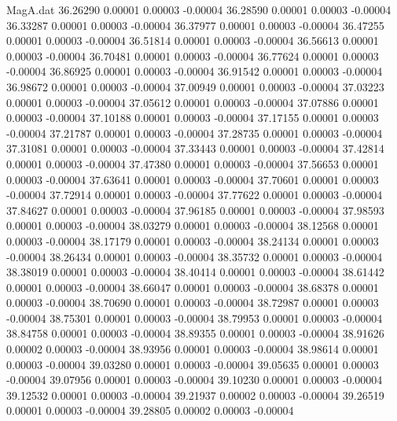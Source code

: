 \begin{filecontents}{MagA.dat}
  36.26290    0.00001    0.00003   -0.00004
  36.28590    0.00001    0.00003   -0.00004
  36.33287    0.00001    0.00003   -0.00004
  36.37977    0.00001    0.00003   -0.00004
  36.47255    0.00001    0.00003   -0.00004
  36.51814    0.00001    0.00003   -0.00004
  36.56613    0.00001    0.00003   -0.00004
  36.70481    0.00001    0.00003   -0.00004
  36.77624    0.00001    0.00003   -0.00004
  36.86925    0.00001    0.00003   -0.00004
  36.91542    0.00001    0.00003   -0.00004
  36.98672    0.00001    0.00003   -0.00004
  37.00949    0.00001    0.00003   -0.00004
  37.03223    0.00001    0.00003   -0.00004
  37.05612    0.00001    0.00003   -0.00004
  37.07886    0.00001    0.00003   -0.00004
  37.10188    0.00001    0.00003   -0.00004
  37.17155    0.00001    0.00003   -0.00004
  37.21787    0.00001    0.00003   -0.00004
  37.28735    0.00001    0.00003   -0.00004
  37.31081    0.00001    0.00003   -0.00004
  37.33443    0.00001    0.00003   -0.00004
  37.42814    0.00001    0.00003   -0.00004
  37.47380    0.00001    0.00003   -0.00004
  37.56653    0.00001    0.00003   -0.00004
  37.63641    0.00001    0.00003   -0.00004
  37.70601    0.00001    0.00003   -0.00004
  37.72914    0.00001    0.00003   -0.00004
  37.77622    0.00001    0.00003   -0.00004
  37.84627    0.00001    0.00003   -0.00004
  37.96185    0.00001    0.00003   -0.00004
  37.98593    0.00001    0.00003   -0.00004
  38.03279    0.00001    0.00003   -0.00004
  38.12568    0.00001    0.00003   -0.00004
  38.17179    0.00001    0.00003   -0.00004
  38.24134    0.00001    0.00003   -0.00004
  38.26434    0.00001    0.00003   -0.00004
  38.35732    0.00001    0.00003   -0.00004
  38.38019    0.00001    0.00003   -0.00004
  38.40414    0.00001    0.00003   -0.00004
  38.61442    0.00001    0.00003   -0.00004
  38.66047    0.00001    0.00003   -0.00004
  38.68378    0.00001    0.00003   -0.00004
  38.70690    0.00001    0.00003   -0.00004
  38.72987    0.00001    0.00003   -0.00004
  38.75301    0.00001    0.00003   -0.00004
  38.79953    0.00001    0.00003   -0.00004
  38.84758    0.00001    0.00003   -0.00004
  38.89355    0.00001    0.00003   -0.00004
  38.91626    0.00002    0.00003   -0.00004
  38.93956    0.00001    0.00003   -0.00004
  38.98614    0.00001    0.00003   -0.00004
  39.03280    0.00001    0.00003   -0.00004
  39.05635    0.00001    0.00003   -0.00004
  39.07956    0.00001    0.00003   -0.00004
  39.10230    0.00001    0.00003   -0.00004
  39.12532    0.00001    0.00003   -0.00004
  39.21937    0.00002    0.00003   -0.00004
  39.26519    0.00001    0.00003   -0.00004
  39.28805    0.00002    0.00003   -0.00004

\end{filecontents}
